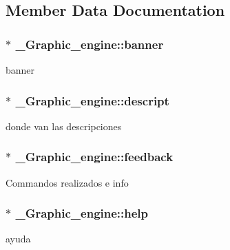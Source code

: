 \subsection{Member Data Documentation}
\subsubsection[{\texorpdfstring{banner}{banner}}]{$\ast$ \+\_\+\+Graphic\+\_\+engine\+::banner}\hypertarget{struct__Graphic__engine_a440dfb2c23c3c4b7d3871187371117b9}{}\label{struct__Graphic__engine_a440dfb2c23c3c4b7d3871187371117b9}
banner 
\subsubsection[{\texorpdfstring{descript}{descript}}]{$\ast$ \+\_\+\+Graphic\+\_\+engine\+::descript}\hypertarget{struct__Graphic__engine_a414bb888ecce3389c7ce348264758e58}{}\label{struct__Graphic__engine_a414bb888ecce3389c7ce348264758e58}
donde van las descripciones 
\subsubsection[{\texorpdfstring{feedback}{feedback}}]{$\ast$ \+\_\+\+Graphic\+\_\+engine\+::feedback}\hypertarget{struct__Graphic__engine_a4fc0ef353d000b20d57fb75d898c6d2d}{}\label{struct__Graphic__engine_a4fc0ef353d000b20d57fb75d898c6d2d}
Commandos realizados e info 
\subsubsection[{\texorpdfstring{help}{help}}]{$\ast$ \+\_\+\+Graphic\+\_\+engine\+::help}\hypertarget{struct__Graphic__engine_ade1d3e95ad6def427f613a4a2d101875}{}\label{struct__Graphic__engine_ade1d3e95ad6def427f613a4a2d101875}
ayuda 

